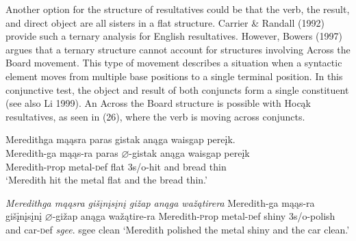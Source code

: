 \documentclass[output=paper]{LSP/langsci}
\begin{document}
Another option for the structure of resultatives could be that the verb, the result, and direct object are all sisters in a flat structure. Carrier \& Randall (1992) provide such a ternary analysis for English resultatives. However, Bowers (1997) argues that a ternary structure cannot account for structures involving Across the Board movement. This type of movement describes a situation when a syntactic element moves from multiple base positions to a single terminal position. In this conjunctive test, the object and result of both conjuncts form a single constituent (see also Li 1999). An Across the Board structure is possible with Hoc\k{a}k resultatives, as seen in (26), where the verb is moving across conjuncts.

\begin{exe}
\ex
\begin{xlist}

\ex \glll Meredithga m\k{a}\k{a}sra paras gistak an\k{a}ga waisgap pere\k{i}k. \\
Meredith-ga m\k{a}\k{a}s-ra paras $\varnothing$-gistak an\k{a}ga waisgap pere\k{i}k\\
Meredith-{\textsc prop} metal-{\textsc def} flat {\textsc 3s/o}-hit and bread thin\\
\glt `Meredith hit the metal flat and the bread thin.'

\ex \textit{Meredithga \hspace{1.58em} m\k{a}\k{a}sra \hspace{.9em} gi\v{s}\k{i}n\k{i}{s}\k{i}n\k{i} \hspace{.1em}gi\v{z}ap  \hspace {2.4em} an\k{a}ga wa\v{z}\k{a}tirera}  \newline Meredith-ga \hspace{1.18em} m\k{a}\k{a}s-ra \hspace {.5em} gi\v{s}\k{i}n\k{i}{s}\k{i}n\k{i} $\varnothing$-gi\v{z}ap \hspace{1.3em} an\k{a}ga wa\v{z}\k{a}tire-ra \newline Meredith-{\textsc prop} metal-{\textsc def} shiny \hspace{1.6em} {\textsc 3s/o}-polish and \hspace{1em} car-{\textsc def} \newline\textit{sgee}. \newline
sgee \newline
clean \newline
`Meredith polished the metal shiny and the car clean.'

\end{xlist}
\end{exe}
 
\end{document}
